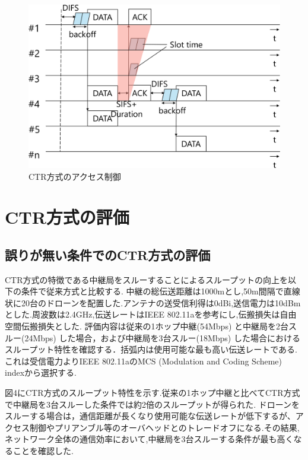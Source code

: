 \documentclass[a4paper,10pt]{ltjsarticle}
\begin{document}
\begin{figure}[H]
  \centering
  \includegraphics[width=\linewidth]{CTR_accsess.pdf} %
  \caption{CTR方式のアクセス制御}
  \label{fig:CTR方式のアクセス制御} %
\end{figure}

\section{CTR方式の評価}
\subsection{誤りが無い条件でのCTR方式の評価}
CTR方式の特徴である中継局をスルーすることによるスループットの向上を以下の条件で従来方式と比較する.
中継の総伝送距離は1000mとし,50m間隔で直線状に20台のドローンを配置した.アンテナの送受信利得は0dBi,送信電力は10dBmとした.周波数は2.4GHz,伝送レートはIEEE 802.11aを参考にし,伝搬損失は自由空間伝搬損失とした.
評価内容は従来の1ホップ中継(54Mbps) と中継局を2台スルー(24Mbps) した場合，および中継局を3台スルー(18Mbps) した場合におけるスループット特性を確認する．括弧内は使用可能な最も高い伝送レートである.これは受信電力よりIEEE 802.11aのMCS (Modulation and Coding Scheme) indexから選択する.

図4にCTR方式のスループット特性を示す.従来の1ホップ中継と比べてCTR方式で中継局を3台スルーした条件では約2倍のスループットが得られた.
ドローンをスルーする場合は，通信距離が長くなり使用可能な伝送レートが低下するが、アクセス制御やプリアンブル等のオーバヘッドとのトレードオフになる.その結果,ネットワーク全体の通信効率において,中継局を3台スルーする条件が最も高くなることを確認した.
\end{document}
